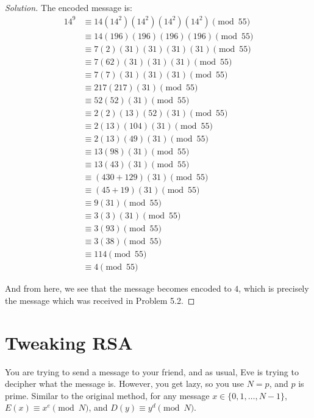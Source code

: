 \documentclass{article}
\newenvironment{solution}{\begin{proof}[Solution]}{\end{proof}}
\begin{document}
\begin{solution}
	The encoded message is:
	\begin{align*}
		14^{9} &\equiv 14(14^{2})(14^{2})(14^{2})(14^{2}) \pmod{55} \\
		&\equiv 14(196)(196)(196)(196) \pmod{55} \\
		&\equiv 7(2)(31)(31)(31)(31) \pmod{55} \\
		&\equiv 7(62)(31)(31)(31) \pmod{55} \\
		&\equiv 7(7)(31)(31)(31) \pmod{55} \\
		&\equiv 217(217)(31) \pmod{55} \\
		&\equiv 52(52)(31) \pmod{55} \\
		&\equiv 2(2)(13)(52)(31) \pmod{55} \\
		&\equiv 2(13)(104)(31) \pmod{55} \\
		&\equiv 2(13)(49)(31) \pmod{55} \\
		&\equiv 13(98)(31) \pmod{55} \\
		&\equiv 13(43)(31) \pmod{55} \\
		&\equiv (430 + 129)(31) \pmod{55} \\
		&\equiv (45 + 19)(31) \pmod{55} \\
		&\equiv 9(31) \pmod{55} \\
		&\equiv 3(3)(31) \pmod{55} \\
		&\equiv 3(93) \pmod{55} \\
		&\equiv 3(38) \pmod{55} \\
		&\equiv 114 \pmod{55} \\
		&\equiv 4 \pmod{55}
	\end{align*}

	And from here, we see that the message becomes encoded to $4$, which is precisely the message which was received in Problem 5.2.
\end{solution}

\newpage

\section{Tweaking RSA}
You are trying to send a message to your friend, and as usual, Eve is trying to decipher what the message is. However, you get lazy, so you use $N = p$, and $p$ is prime. Similar to the original method, for any message $x \in \{0,1, \ldots, N-1\}$, $E(x) \equiv x^e \pmod{N}$, and $D(y) \equiv y^d \pmod{N}$.
\end{document}
